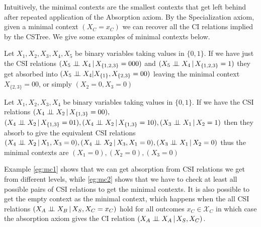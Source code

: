\documentclass{tufte-book}
\begin{document}
Intuitively, the minimal contexts are the smallest contexts that get left behind after repeated application of the Absorption axiom. By the Specialization axiom, given a minimal context \((X_C=x_C)\) we can recover all the CI relations implied by the CSTree. We give some examples of minimal contexts below.

\begin{example}\label{eg:mc1}
Let $X_1,X_2,X_3,X_4,X_5$ be binary variables taking values in $\{0,1\}$. If we have just the CSI relations $(X_5 \perp \!\!\! \perp X_4 \,|\, X_{\{1,2,3\}}=000)$ and $(X_5 \perp \!\!\! \perp X_4 \,|\, X_{\{1,2,3\}}=1)$ they get absorbed into $(X_5 \perp \!\!\! \perp X_4 | X_{\{1\}}, X_{\{2,3\}}=00)$ leaving the minimal context $X_{\{2,3\}}=00$, or simply $(X_2 = 0, X_3=0)$  
\end{example}

\begin{example}\label{eg:mc2}
Let $X_1,X_2,X_3,X_4$ be binary variables taking values in $\{0,1\}$. If we have the  CSI relations $(X_4 \perp \!\!\! \perp X_2 \,|\, X_{\{1,3\}}=00), $\\$ (X_4 \indep X_2 \,|\, X_{\{1,3\}}=01), (X_4 \indep X_2 \,|\, X_{\{1,3\}}=10), (X_3 \indep X_1 \,|\, X_2=1)$ then they absorb to give the equivalent CSI relations $(X_4 \indep X_2 \, |\,X_1, X_3=0), (X_4 \indep X_2 \,|\, X_3, X_1=0), (X_3 \indep X_1 \,|\,X_2=0)$ thus the minimal contexts are $(X_1=0),(X_2=0),(X_3=0)$
\end{example}

Example \ref{eg:mc1} shows that we can get absorption from CSI relations we get from different levels, while \ref{eg:mc2} shows that we have to check at least all possible pairs of CSI relations to get the minimal contexts. It is also possible to get the empty context as the minimal context, which happens when the all CSI relations \((X_A \perp \!\!\! \perp X_B \,|\, X_S, X_C=x_C)\) hold for all outcomes \(x_C \in \mathcal{X}_C\) in which case the absorption axiom gives the CI relation \((X_A \perp \!\!\! \perp X_A\,|\,X_S,X_C)\).
\end{document}
